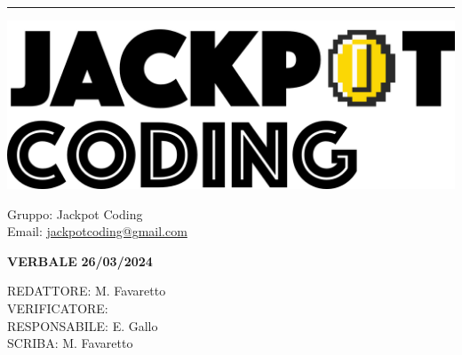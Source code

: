 \documentclass[5pt]{article}
\begin{document}
\hrule
\begin{minipage}[t]{0.50\textwidth}
    \begin{flushleft}
        \hspace{10pt}
        \includegraphics[scale=0.65]{jackpot-logo.png} 
    \end{flushleft}
\end{minipage}
\hspace{-60pt} %
\begin{flushright}
    \begin{minipage}[t]{0.50\textwidth}
        \begin{flushright}
            Gruppo: {\Large Jackpot Coding}\\
            Email: \href{mailto:jackpotcoding@gmail.com}{jackpotcoding@gmail.com}
        \end{flushright}
    \end{minipage}
\end{flushright}

\vspace{15pt}

\begin{center}
    \textbf{\large VERBALE }
    \textbf{\large 26/03/2024} \\
    \textbf{\Large}
\end{center}

\vspace{13pt}

\begin{flushleft}
    \begin{spacing}{1.5}
        REDATTORE:  M. Favaretto \\
        VERIFICATORE:  \\%
        RESPONSABILE: E. Gallo \\%
        \vspace{7pt}
        SCRIBA: M. Favaretto\\%
    \end{spacing}
\end{flushleft}
\end{document}
